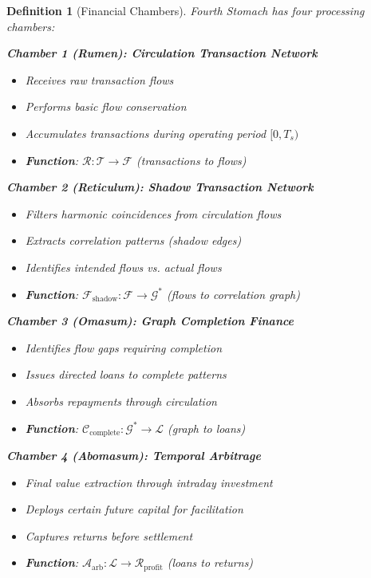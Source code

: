 \documentclass[12pt]{article}
\newtheorem{definition}[theorem]{Definition}
\begin{document}
\begin{definition}[Financial Chambers]
Fourth Stomach has four processing chambers:

\textbf{Chamber 1 (Rumen): Circulation Transaction Network}
\begin{itemize}
    \item Receives raw transaction flows
    \item Performs basic flow conservation
    \item Accumulates transactions during operating period $[0, T_s)$
    \item \textbf{Function}: $\mathcal{R}: \mathcal{T} \to \mathcal{F}$ (transactions to flows)
\end{itemize}

\textbf{Chamber 2 (Reticulum): Shadow Transaction Network}
\begin{itemize}
    \item Filters harmonic coincidences from circulation flows
    \item Extracts correlation patterns (shadow edges)
    \item Identifies intended flows vs. actual flows
    \item \textbf{Function}: $\mathcal{F}_{\text{shadow}}: \mathcal{F} \to \mathcal{G}^*$ (flows to correlation graph)
\end{itemize}

\textbf{Chamber 3 (Omasum): Graph Completion Finance}
\begin{itemize}
    \item Identifies flow gaps requiring completion
    \item Issues directed loans to complete patterns
    \item Absorbs repayments through circulation
    \item \textbf{Function}: $\mathcal{C}_{\text{complete}}: \mathcal{G}^* \to \mathcal{L}$ (graph to loans)
\end{itemize}

\textbf{Chamber 4 (Abomasum): Temporal Arbitrage}
\begin{itemize}
    \item Final value extraction through intraday investment
    \item Deploys certain future capital for facilitation
    \item Captures returns before settlement
    \item \textbf{Function}: $\mathcal{A}_{\text{arb}}: \mathcal{L} \to \mathcal{R}_{\text{profit}}$ (loans to returns)
\end{itemize}
\end{definition}
\end{document}
